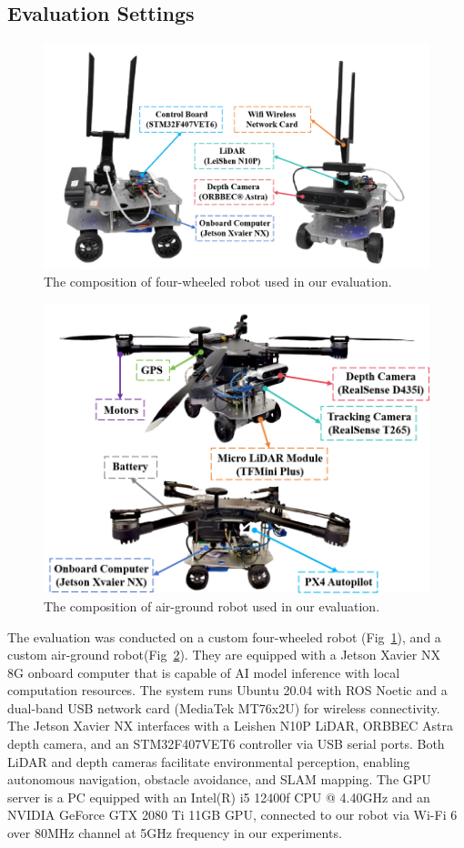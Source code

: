 \subsection{Evaluation Settings}
\begin{figure}
    \includegraphics[width=\linewidth]{fig/robot.png}
    \caption[agr robot]{The composition of four-wheeled robot used in our evaluation.}
    \label{fig:robot}
\end{figure}
\begin{figure}
    \includegraphics[width=\linewidth]{fig/agr_robot.png}
    \caption[agr robot]{The composition of air-ground robot used in our evaluation.}
    \label{fig:agr}
\end{figure}
The evaluation was conducted on a custom four-wheeled robot (Fig~\ref{fig:robot}), and a custom air-ground robot(Fig~\ref{fig:agr}).
They are equipped with a Jetson Xavier NX~\cite{jetsonnx} 8G onboard computer that is capable of AI model inference with local computation resources. 
The system runs Ubuntu 20.04 with ROS Noetic and a dual-band USB network card (MediaTek MT76x2U) for wireless connectivity. 
The Jetson Xavier NX interfaces with a Leishen N10P LiDAR, ORBBEC Astra depth camera, and an STM32F407VET6 controller via USB serial ports. 
Both LiDAR and depth cameras facilitate environmental perception, enabling autonomous navigation, obstacle avoidance, and SLAM mapping. 
The GPU server is a PC equipped with an Intel(R) i5 12400f CPU @ 4.40GHz and an NVIDIA GeForce GTX 2080 Ti 11GB GPU, connected to our robot via Wi-Fi 6 over 80MHz channel at 5GHz frequency in our experiments.

